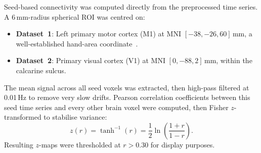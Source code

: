 Seed-based connectivity was computed directly from the preprocessed
time series. A 6\,mm-radius spherical ROI was centred on:
\begin{itemize}
  \item \textbf{Dataset~1}: Left primary motor cortex (M1) at MNI
        $[-38, -26, 60]$\,mm, a well-established hand-area
        coordinate~\cite{Biswal1995}.
  \item \textbf{Dataset~2}: Primary visual cortex (V1) at MNI
        $[0, -88, 2]$\,mm, within the calcarine sulcus.
\end{itemize}
The mean signal across all seed voxels was extracted, then high-pass
filtered at 0.01\,Hz to remove very slow drifts. Pearson correlation
coefficients between this seed time series and every other brain voxel
were computed, then Fisher $z$-transformed to stabilise variance:
\begin{equation}
  z(r) = \tanh^{-1}(r) =
  \frac{1}{2}\ln\!\left(\!\frac{1+r}{1-r}\!\right).
\end{equation}
Resulting $z$-maps were thresholded at $r > 0.30$ for display
purposes.

